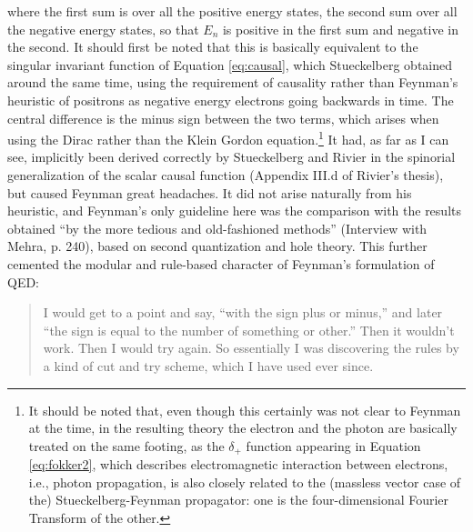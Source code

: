 \documentclass[12pt]{article}
\begin{document}
where the first sum is over all the positive energy states, the second sum over all the negative energy states, so that $E_n$ is positive in the first sum and negative in the second. It should first be noted that this is basically equivalent to the singular invariant function of Equation \ref{eq:causal}, which Stueckelberg obtained around the same time, using the requirement of causality rather than Feynman's heuristic of positrons as negative energy electrons going backwards in time. The central difference is the minus sign between the two terms, which arises when using the Dirac rather than the Klein Gordon equation.\footnote{It should be noted that, even though this certainly was not clear to Feynman at the time, in the resulting theory the electron and the photon are basically treated on the same footing, as the $\delta_+$ function appearing in Equation \ref{eq:fokker2}, which describes electromagnetic interaction between electrons, i.e., photon propagation, is also closely related to the (massless vector case of the) Stueckelberg-Feynman propagator: one is the four-dimensional Fourier Transform of the other.}  It had, as far as I can see, implicitly been derived correctly by Stueckelberg and Rivier in the spinorial generalization of the scalar causal function (Appendix III.d of Rivier's thesis), but caused Feynman great headaches. It did not arise naturally from his heuristic, and Feynman's only guideline here was the comparison with the results obtained ``by the more tedious and old-fashioned methods'' (Interview with Mehra, p. 240), based on second quantization and hole theory. This further cemented the modular and rule-based character of Feynman's formulation of QED:

\begin{quote}
I would get to a point and say, ``with the sign plus or minus,'' and later ``the sign is equal to the number of something or other.'' Then it wouldn't work. Then I would try again. So essentially I was discovering the rules by a kind of cut and try scheme, which I have used ever since.
\end{quote}
\end{document}
